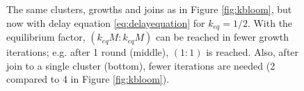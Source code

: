 \begin{figure}[p]
\begin{tikzpicture}
  \end{tikzpicture}
  \caption{The same clusters, growths and joins as in Figure \ref{fig:kbloom}, but now with delay equation \eqref{eq:delayequation} for $k_{eq} = 1/2$. With the equilibrium factor, $(k_{eq}M:k_{eq}M)$ can be reached in fewer growth iterations; e.g. after 1 round (middle), $(1:1)$ is reached. Also, after join to a single cluster (bottom), fewer iterations are needed (2 compared to 4 in Figure \ref{fig:kbloom}).}\label{fig:kbloom2}
\end{figure}